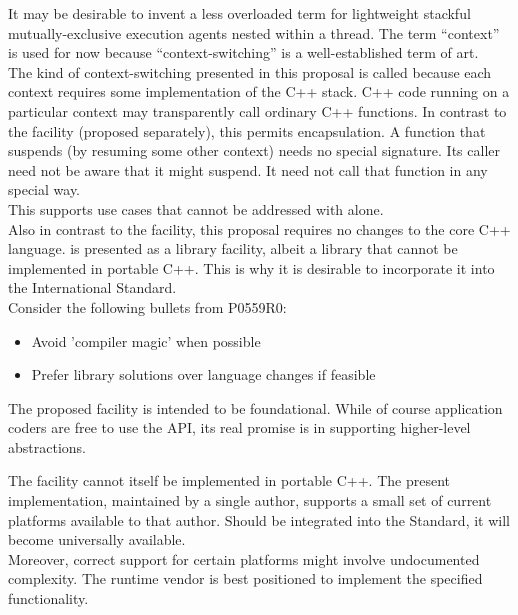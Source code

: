 \documentclass[fontsize=10pt,paper=A4,pagesize,DIV=15]{scrartcl}
\begin{document}
It may be desirable to invent a less overloaded term for lightweight stackful
mutually-exclusive execution agents nested within a thread. The term
``context'' is used for now because ``context-switching'' is a well-established
term of art.\\

The kind of context-switching presented in this proposal is called
 because each context requires some implementation of the C++
stack. C++ code running on a particular context may transparently call
ordinary C++ functions. In contrast to the \bfs{\coawait}
facility (proposed separately\cite{N4649}), this permits encapsulation. A
function that suspends (by resuming some other context) needs no special
signature. Its caller need not be aware that it might suspend. It need not
call that function in any special way.\\

This supports use cases that cannot be addressed with \coawait alone.\\

Also in contrast to the \coawait facility, this proposal requires no
changes to the core C++ language. \cc is presented as a library facility,
albeit a library that cannot be implemented in portable C++. This is why it is
desirable to incorporate it into the International Standard.\\

Consider the following bullets from P0559R0:\cite{P0559R0}

\begin{itemize}
\item Avoid 'compiler magic' when possible
\item Prefer library solutions over language changes if feasible
\end{itemize}

The proposed \cc facility is intended to be foundational. While of course
application coders are free to use the \cc API, its real promise is in
supporting higher-level abstractions.


The \cc facility cannot itself be implemented in portable C++. The present
implementation,\cite{bcontext} maintained by a single author, supports a
small set of current platforms available to that author. Should \cc be
integrated into the Standard, it will become universally available.\\

Moreover, correct support for certain platforms might involve undocumented
complexity. The runtime vendor is best positioned to implement the specified
functionality.\\
\end{document}
